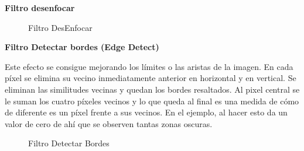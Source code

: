 \documentclass[
  a4paper,
  DIV=11,
  numbers=noendperiod]{scrreprt}
\begin{document}
\textbf{Filtro desenfocar}

\begin{figure}


\caption{\label{fig-filtro_desenfocar}Filtro DesEnfocar}

\end{figure}%

\textbf{Filtro Detectar bordes (Edge Detect)}

Este efecto se consigue mejorando los límites o las aristas de la
imagen. En cada píxel se elimina su vecino inmediatamente anterior en
horizontal y en vertical. Se eliminan las similitudes vecinas y quedan
los bordes resaltados. Al pixel central se le suman los cuatro píxeles
vecinos y lo que queda al final es una medida de cómo de diferente es un
píxel frente a sus vecinos. En el ejemplo, al hacer esto da un valor de
cero de ahí que se observen tantas zonas oscuras.

\begin{figure}


\caption{\label{fig-filtro_bordes}Filtro Detectar Bordes}

\end{figure}%
\end{document}
